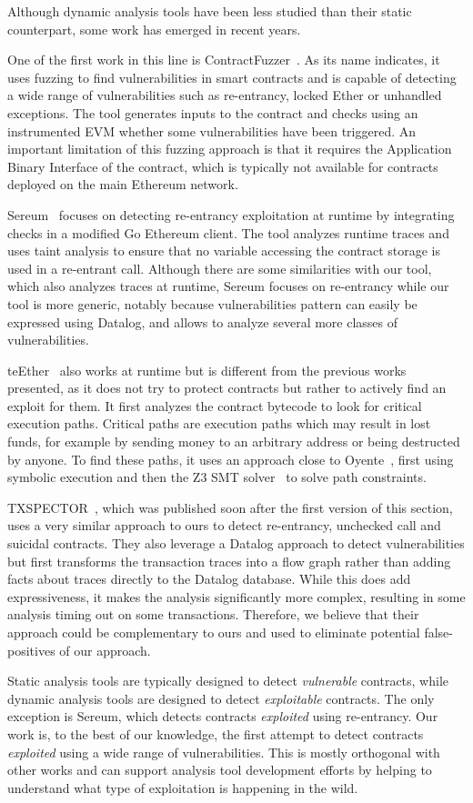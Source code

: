  Although dynamic analysis tools have been less studied than their static counterpart, some work has emerged in recent years.

One of the first work in this line is ContractFuzzer~\cite{Jiang2018}.
As its name indicates, it uses fuzzing to find vulnerabilities in smart contracts and is capable of detecting a wide range of vulnerabilities such as re-entrancy, locked Ether or unhandled exceptions.
The tool generates inputs to the contract and checks using an instrumented EVM whether some vulnerabilities have been triggered.
An important limitation of this fuzzing approach is that it requires the Application Binary Interface of the contract, which is typically not available for contracts deployed on the main Ethereum network.

Sereum~\cite{Rodler2019} focuses on detecting re-entrancy exploitation at runtime by integrating checks in a modified Go Ethereum client.
The tool analyzes runtime traces and uses taint analysis to ensure that no variable accessing the contract storage is used in a re-entrant call.
Although there are some similarities with our tool, which also analyzes traces at runtime, Sereum focuses on re-entrancy while our tool is more generic, notably because vulnerabilities pattern can easily be expressed using Datalog, and allows to analyze several more classes of vulnerabilities.

teEther~\cite{Krupp2018} also works at runtime but is different from the previous works presented, as it does not try to protect contracts but rather to actively find an exploit for them. It first analyzes the contract bytecode to look for critical execution paths.
Critical paths are execution paths which may result in lost funds, for example by sending money to an arbitrary address or being destructed by anyone.
To find these paths, it uses an approach close to Oyente~\cite{Luu2016a}, first using symbolic execution and then the Z3 SMT solver~\cite{de2008z3} to solve path constraints.

TXSPECTOR~\cite{255340}, which was published soon after the first version of this section, uses a very similar approach to ours to detect re-entrancy, unchecked call and suicidal contracts.
They also leverage a Datalog approach to detect vulnerabilities but first transforms the transaction traces into a flow graph rather than adding facts about traces directly to the Datalog database.
While this does add expressiveness, it makes the analysis significantly more complex, resulting in some analysis timing out on some transactions. Therefore, we believe that their approach could be complementary to ours and used to eliminate potential false-positives of our approach.

 Static analysis tools are typically designed to detect \emph{vulnerable} contracts, while dynamic analysis tools are designed to detect \emph{exploitable} contracts. The only exception is Sereum, which detects contracts \emph{exploited} using re-entrancy.
Our work is, to the best of our knowledge, the first attempt to detect contracts \emph{exploited} using a wide range of vulnerabilities.
This is mostly orthogonal with other works and can support analysis tool development efforts by helping to understand what type of exploitation is happening in the wild.
